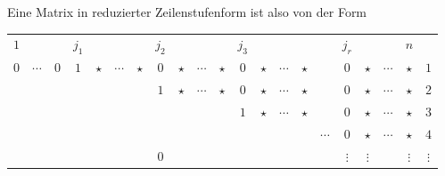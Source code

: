 \documentclass[a4paper]{article}
\begin{document}
Eine Matrix in reduzierter Zeilenstufenform ist also von der Form
\begin{center}
    \begin{tabular}{|cccccccccccccccccccc|c}
        \multicolumn{1}{c}{$1$} &          &     & $j_1$                     &         &          &         & $j_2$                     &         &          &         & $j_3$                     &         &          &         &                               & $j_r$                          &          &          & \multicolumn{1}{c}{$n$} &          \\ \cline{1-20}
        $0$                     & $\cdots$ & $0$ & \multicolumn{1}{|c|}{$1$} & $\star$ & $\cdots$ & $\star$ & \multicolumn{1}{|c|}{$0$} & $\star$ & $\cdots$ & $\star$ & \multicolumn{1}{|c|}{$0$} & $\star$ & $\cdots$ & $\star$ & \multicolumn{1}{|c}{}         & \multicolumn{1}{|c|}{$0$}      & $\star$  & $\cdots$ & $\star$                 & $1$      \\ \cline{1-7}
                                &          &     &                           &         &          &         & \multicolumn{1}{|c|}{$1$} & $\star$ & $\cdots$ & $\star$ & \multicolumn{1}{|c|}{$0$} & $\star$ & $\cdots$ & $\star$ & \multicolumn{1}{|c}{}         & \multicolumn{1}{|c|}{$0$}      & $\star$  & $\cdots$ & $\star$                 & $2$      \\ \cline{8-11}
                                &          &     &                           &         &          &         &                           &         &          &         & \multicolumn{1}{|c|}{$1$} & $\star$ & $\cdots$ & $\star$ & \multicolumn{1}{|c}{}         & \multicolumn{1}{|c|}{$0$}      & $\star$  & $\cdots$ & $\star$                 & $3$      \\ \cline{12-15}
                                &          &     &                           &         &          &         &                           &         &          &         &                           &         &          &         & \multicolumn{1}{|c}{$\cdots$} & \multicolumn{1}{|c|}{$0$}      & $\star$  & $\cdots$ & $\star$                 & $4$      \\
                                &          &     &                           &         &          &         & $0$                       &         &          &         &                           &         &          &         & \multicolumn{1}{|c}{}         & \multicolumn{1}{|c|}{$\vdots$} & $\vdots$ &          & $\vdots$                & $\vdots$ \\

\end{tabular}
\end{center}
\end{document}
